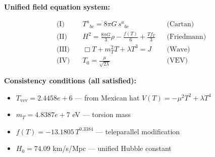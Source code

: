 
\textbf{Unified field equation system:}

\begin{align}
  \text{(I)} \quad & T^a{}_{bc} = 8\pi G \, s^a{}_{bc} && \text{(Cartan)} \\
  \text{(II)} \quad & H^2 = \frac{8\pi G}{3}\rho - \frac{f(T)}{6} + \frac{Tf_T}{3} && \text{(Friedmann)} \\
  \text{(III)} \quad & \Box T + m_T^2 T + \lambda T^3 = J && \text{(Wave)} \\
  \text{(IV)} \quad & T_0 = \frac{\mu}{\sqrt{2\lambda}} && \text{(VEV)}
\end{align}

\textbf{Consistency conditions (all satisfied):}
\begin{itemize}
  \item $T_{\text{vev}} = 2.4458e+6$ — from Mexican hat $V(T) = -\mu^2 T^2 + \lambda T^4$
  \item $m_T = 4.8387e+7$ eV — torsion mass
  \item $f(T) = -13.1805 \, T^{0.3384}$ — teleparallel modification
  \item $H_0 = 74.09$ km/s/Mpc — unified Hubble constant
\end{itemize}